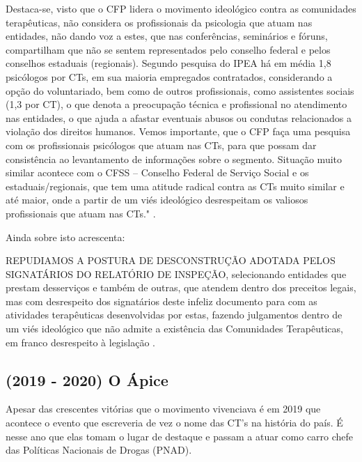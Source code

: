 \documentclass[
	12pt,				%
	oneside,			%
	a4paper,			%
	sumario=tradicional,
	english,			%
	brazil				%
	]{abntex2}
\begin{document}
\begin{quoting}[rightmargin=0cm,leftmargin=4cm]
\begin{singlespace}
{\footnotesize
Destaca-se, visto que o CFP lidera o movimento ideológico contra as comunidades terapêuticas, não considera os profissionais da psicologia que atuam nas entidades, não dando voz a estes, que nas conferências, seminários e fóruns, compartilham que não se sentem representados pelo conselho federal e pelos conselhos estaduais (regionais). Segundo pesquisa do IPEA há em média 1,8 psicólogos por CTs, em sua maioria empregados contratados, considerando a opção do voluntariado, bem como de outros profissionais, como assistentes sociais (1,3 por CT), o que denota a preocupação técnica e profissional no atendimento nas entidades, o que ajuda a afastar eventuais abusos ou condutas relacionados a violação dos direitos humanos. Vemos importante, que o CFP faça uma pesquisa com os profissionais psicólogos que atuam nas CTs, para que possam dar consistência ao levantamento de informações sobre o segmento. Situação muito similar acontece com o CFSS – Conselho Federal de Serviço Social e os estaduais/regionais, que tem uma atitude radical contra as CTs muito similar e até maior, onde a partir de um viés ideológico desrespeitam os valiosos profissionais que atuam nas CTs." \cite[p. 03-04]{confenact2018b}.}
\end{singlespace}
\end{quoting}
Ainda sobre isto acrescenta:
\begin{quoting}[rightmargin=0cm,leftmargin=4cm]
\begin{singlespace}
{\footnotesize
REPUDIAMOS A POSTURA DE DESCONSTRUÇÃO ADOTADA PELOS SIGNATÁRIOS DO RELATÓRIO DE INSPEÇÃO, selecionando entidades que prestam desserviços e também de outras, que atendem dentro dos preceitos legais, mas com desrespeito dos signatários deste infeliz documento para com as atividades terapêuticas desenvolvidas por estas, fazendo julgamentos dentro de um viés ideológico que não admite a existência das Comunidades Terapêuticas, em franco desrespeito à legislação \cite[p. 06]{confenact2018b}.}
\end{singlespace}
\end{quoting}
\hypertarget{o-uxe1pice}{%
\subsection{(2019 - 2020) O Ápice}\label{o-uxe1pice}}

Apesar das crescentes vitórias que o movimento vivenciava é em 2019 que acontece o evento que escreveria de vez o nome das CT's na história do país. É nesse ano que elas tomam o lugar de destaque e passam a atuar como carro chefe das Políticas Nacionais de Drogas (\acrshort{PNAD}).
\end{document}

